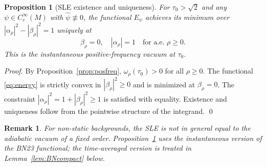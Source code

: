 \documentclass[12pt,letterpaper]{article}
\newtheorem{proposition}[theorem]{Proposition}
\newtheorem{remark}[theorem]{Remark}
\begin{document}
\begin{proposition}[SLE existence and uniqueness]
\label{prop:SLE}
For $\tau_0 > \sqrt{2}$ and any $\psi \in C_c^\infty(M)$
with $\hat\psi \not\equiv 0$,
the functional $E_\psi$ achieves its minimum over
$|\alpha_\rho|^2 - |\beta_\rho|^2 = 1$ uniquely at
\begin{equation}
  \beta_\rho = 0, \quad |\alpha_\rho| = 1 \quad \text{for a.e. } \rho \geq 0.
  \label{eq:SLE}
\end{equation}
This is the \emph{instantaneous positive-frequency vacuum} at $\tau_0$.
\end{proposition}
\begin{proof}
By Proposition~\ref{prop:posfreq}, $\omega_\rho(\tau_0) > 0$ for all
$\rho \geq 0$.
The functional \eqref{eq:energy} is strictly convex in
$|\beta_\rho|^2 \geq 0$ and is minimized at $\beta_\rho = 0$.
The constraint $|\alpha_\rho|^2 = 1 + |\beta_\rho|^2 \geq 1$
is satisfied with equality.
Existence and uniqueness follow from the pointwise structure of
the integrand.
\qed
\end{proof}

\begin{remark}
For non-static backgrounds, the SLE is \emph{not} in general
equal to the adiabatic vacuum of a fixed order.
Proposition~\ref{prop:SLE} uses the instantaneous version of the
BN23 functional; the time-averaged version is treated in
Lemma~\ref{lem:BNcompact} below.
\end{remark}
\end{document}
